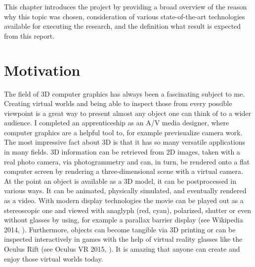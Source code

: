 This chapter introduces the project by providing a broad overview of the reason why this topic was chosen, consideration of various state-of-the-art technologies available for executing the research, and the definition what result is expected from this report.

\section{Motivation}

The field of 3D computer graphics has always been a fascinating subject to me. Creating virtual worlds and being able to inspect those from every possible viewpoint is a great way to present almost any object one can think of to a wider audience. I completed an apprenticeship as an A/V media designer, where computer graphics are a helpful tool to, for example previsualize camera work. The most impressive fact about 3D is that it has so many versatile applications in many fields. 3D information can be retrieved from 2D images, taken with a real photo camera, via photogrammetry and can, in turn, be rendered onto a flat computer screen by rendering a three-dimensional scene with a virtual camera. At the point an object is available as a 3D model, it can be postprocessed in various ways. It can be animated, physically simulated, and eventually rendered as a video. With modern display technologies the movie can be played out as a stereoscopic one and viewed with anaglyph (red, cyan), polarized, shutter or even without glasses by using, for example a parallax barrier display (see Wikipedia 2014, \parencite{wiki:ParallaxBarrier}). Furthermore, objects can become tangible via 3D printing or can be inspected interactively in games with the help of virtual reality glasses like the Oculus Rift (see Oculus VR 2015, \parencite{OculusVR}). It is amazing that anyone can create and enjoy those virtual worlds today.

